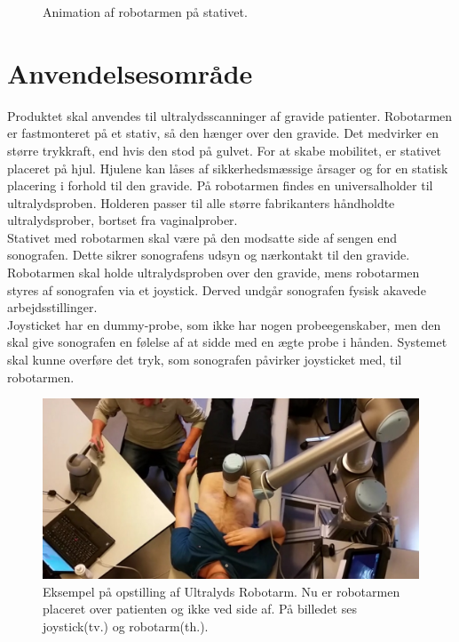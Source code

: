 \begin{figure}[H]
\begin{minipage}{0.55\textwidth}
		\caption{Animation af robotarmen på stativet.}
		\label{Robotstativ}
	\end{minipage}
\end{figure}

\section{Anvendelsesområde}
Produktet skal anvendes til ultralydsscanninger af gravide patienter. Robotarmen er fastmonteret på et stativ, så den hænger over den gravide. Det medvirker en større trykkraft, end hvis den stod på gulvet. For at skabe mobilitet, er stativet placeret på hjul. Hjulene kan låses af sikkerhedsmæssige årsager og for en statisk placering i forhold til den gravide. På robotarmen findes en universalholder til ultralydsproben. Holderen passer til alle større fabrikanters håndholdte ultralydsprober, bortset fra vaginalprober.\\

Stativet med robotarmen skal være på den modsatte side af sengen end sonografen. Dette sikrer sonografens udsyn og nærkontakt til den gravide.
Robotarmen skal holde ultralydsproben over den gravide, mens robotarmen styres af sonografen via et joystick. Derved undgår sonografen fysisk akavede arbejdsstillinger. \\
Joysticket har en dummy-probe, som ikke har nogen probeegenskaber, men den skal give sonografen en følelse af at sidde med en ægte probe i hånden.
Systemet skal kunne overføre det tryk, som sonografen påvirker joysticket med, til robotarmen.

\begin{figure}[H]\centering
	\includegraphics[width = 1.0\textwidth]{Figurer/ergonomiskLosning.jpg}
	\caption{Eksempel på opstilling af Ultralyds Robotarm. Nu er robotarmen placeret over patienten og ikke ved side af. På billedet ses joystick(tv.) og robotarm(th.).  }
	\label{ergonomiskLosning}
\end{figure}


